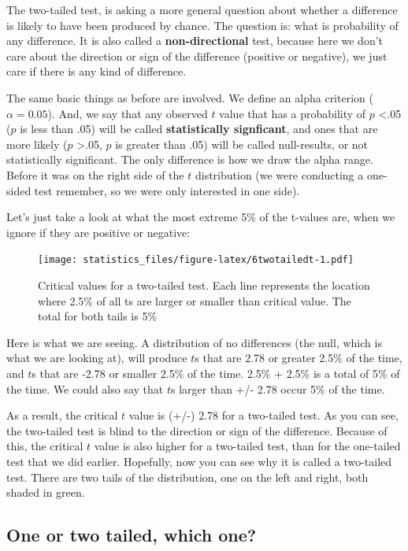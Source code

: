 \documentclass[]{book}
\begin{document}
The two-tailed test, is asking a more general question about whether a difference is likely to have been produced by chance. The question is: what is probability of any difference. It is also called a \textbf{non-directional} test, because here we don't care about the direction or sign of the difference (positive or negative), we just care if there is any kind of difference.

The same basic things as before are involved. We define an alpha criterion (\(\alpha = 0.05\)). And, we say that any observed \(t\) value that has a probability of \(p\) \textless{}.05 (\(p\) is less than .05) will be called \textbf{statistically signficant}, and ones that are more likely (\(p\) \textgreater{}.05, \(p\) is greater than .05) will be called null-results, or not statistically significant. The only difference is how we draw the alpha range. Before it was on the right side of the \(t\) distribution (we were conducting a one-sided test remember, so we were only interested in one side).

Let's just take a look at what the most extreme 5\% of the t-values are, when we ignore if they are positive or negative:

\begin{figure}
\centering
\texttt{[image: statistics\_files/figure-latex/6twotailedt-1.pdf]}
\caption{\label{fig:6twotailedt}Critical values for a two-tailed test. Each line represents the location where 2.5\% of all ts are larger or smaller than critical value. The total for both tails is 5\%}
\end{figure}

Here is what we are seeing. A distribution of no differences (the null, which is what we are looking at), will produce \(t\)s that are 2.78 or greater 2.5\% of the time, and \(t\)s that are -2.78 or smaller 2.5\% of the time. 2.5\% + 2.5\% is a total of 5\% of the time. We could also say that \(t\)s larger than +/- 2.78 occur 5\% of the time.

As a result, the critical \(t\) value is (+/-) 2.78 for a two-tailed test. As you can see, the two-tailed test is blind to the direction or sign of the difference. Because of this, the critical \(t\) value is also higher for a two-tailed test, than for the one-tailed test that we did earlier. Hopefully, now you can see why it is called a two-tailed test. There are two tails of the distribution, one on the left and right, both shaded in green.

\hypertarget{one-or-two-tailed-which-one}{%
\subsection{One or two tailed, which one?}\label{one-or-two-tailed-which-one}}
\end{document}
